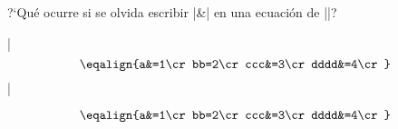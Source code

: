 

\enunciadoS ?`Qu\'e ocurre si se olvida escribir |&| en una ecuaci\'on
de |\eqalign|?

\bigskip


|$$\eqalign{a&=1\cr bb=2\cr ccc&=3\cr dddd&=4\cr}$$|

$$\eqalign{a&=1\cr bb=2\cr ccc&=3\cr dddd&=4\cr}$$

\bye

